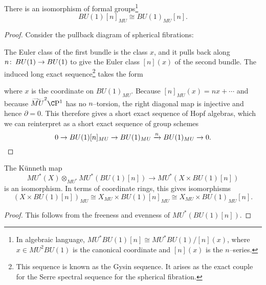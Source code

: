 \begin{lemma}\label{MUConvertsTorsionPointsToTorsionPoints}
There is an isomorphism of formal groups\footnote{In algebraic language, \(MU^* BU(1)[n] \cong MU^* BU(1) / [n](x)\), where \(x \in MU^2 BU(1)\) is the canonical coordinate and \([n](x)\) is the \(n\)--series.} \[BU(1)[n]_{MU} \cong BU(1)_{MU}[n].\]
\end{lemma}
\begin{proof}
Consider the pullback diagram of spherical fibrations:
\begin{center}
\end{center}
The Euler class of the first bundle is the class \(x\), and it pulls back along \(n\colon\thinspace BU(1) \to BU(1)\) to give the Euler class \([n](x)\) of the second bundle.  The induced long exact sequence\footnote{This sequence is known as the Gysin sequence.  It arises as the exact couple for the Serre spectral sequence for the spherical fibration.} takes the form
\begin{center}
\end{center}
where \(x\) is the coordinate on \(BU(1)_{MU}\).  Because \([n]_{MU}(x) = nx + \cdots\) and because \(\widetilde{MU}^2 \CP^1\) has no \(n\)--torsion, the right diagonal map is injective and hence \(\partial = 0\).  This therefore gives a short exact sequence of Hopf algebras, which we can reinterpret as a short exact sequence of group schemes \[0 \to BU(1)[n]_{MU} \to BU(1)_{MU} \xrightarrow{n} BU(1)_{MU} \to 0. \qedhere\]
\end{proof}

\begin{corollary}
The K\"unneth map \[MU^*(X) \otimes_{MU^*} MU^*(BU(1)[n]) \to MU^*(X \times BU(1)[n])\] is an isomorphism.  In terms of coordinate rings, this gives isomorphisms \[(X \times BU(1)[n])_{MU} \cong X_{MU} \times BU(1)[n]_{MU} \cong X_{MU} \times BU(1)_{MU}[n].\]
\end{corollary}
\begin{proof}
This follows from the freeness and evenness of \(MU^*(BU(1)[n])\).
\end{proof}

